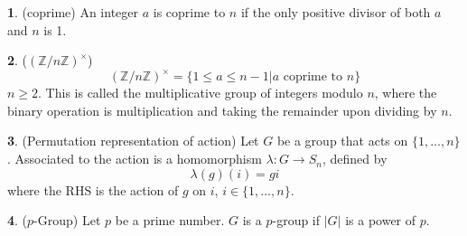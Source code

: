 \documentclass[12pt]{article}
\theoremstyle{definition}
\newtheorem{definition}{\color{NavyBlue}{\textbf{Definition}}}
\begin{document}
\begin{definition}(coprime)
An integer $a$ is coprime to $n$ if the only positive divisor of both $a$ and $n$ is 1.
\end{definition}

\begin{definition}($(\mathbb{Z}/n \mathbb{Z})^{\times}$)
\begin{equation}
(\mathbb{Z}/n \mathbb{Z})^{\times} = \{1 \leq a \leq n - 1 | a \text{ coprime to } n\}
\end{equation}
$n \geq 2$. This is called the multiplicative group of integers modulo $n$, where the binary operation is multiplication and taking the remainder upon dividing by $n$.
\end{definition}

\begin{definition}(Permutation representation of action)
Let $G$ be a group that acts on $\{1,\ldots, n\}$. Associated to the action is a homomorphism $\lambda : G \to S_n$, defined by
\begin{equation}
\lambda(g)(i) = gi
\end{equation}
where the RHS is the action of $g$ on $i$, $i \in \{1,\ldots, n\}$.
\end{definition}

\begin{definition}($p$-Group)
Let $p$ be a prime number. $G$ is a $p$-group if $|G|$ is a power of $p$.
\end{definition}
\end{document}
